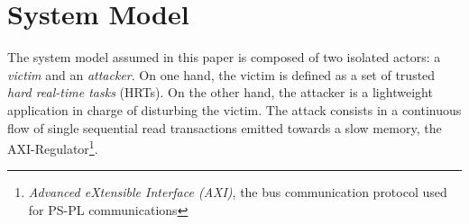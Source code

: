 \section{System Model}
    \label{sec:system_model}




    The system model assumed in this paper is composed of two isolated actors: a \emph{victim} and an \emph{attacker}.
    On one hand, the victim is defined as a set of trusted \emph{hard real-time tasks} (HRTs).
    On the other hand, the attacker is a lightweight application in charge of disturbing the victim.
    The attack consists in a continuous flow of single sequential read transactions emitted towards a slow memory, the AXI-Regulator\footnote{\emph{Advanced eXtensible Interface (AXI)}, the bus communication protocol used for PS-PL communications}.

